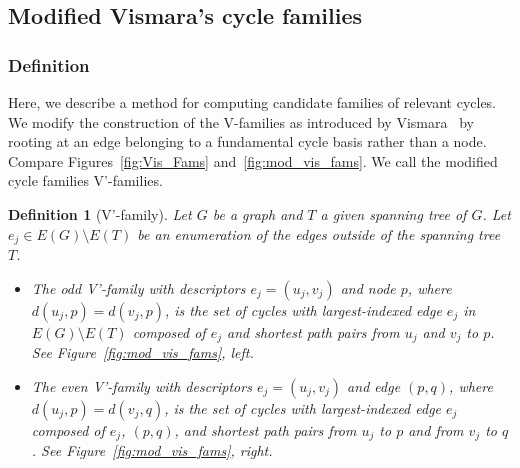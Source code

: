 \documentclass[fleqn,11pt]{article}
\newtheorem{definition}{Definition}
\begin{document}
\subsection{Modified Vismara's cycle families}
\label{sub:Vis_Fam}


\subsubsection{Definition}

{Here, we describe a method for computing candidate families of relevant cycles. 
We modify the construction of the V-families as introduced by Vismara~\cite{vismaraUnion1997} by rooting at an edge belonging to a fundamental cycle basis rather than a node. 
Compare Figures~\ref{fig:Vis_Fams} and~\ref{fig:mod_vis_fams}.
We call the modified cycle families V'-families.}
\begin{definition}[V'-family]
	Let $G$ be a graph and $T$ a given spanning tree of $G$. Let $e_j\in E(G)\setminus E(T)$ be an enumeration of the edges outside of the spanning tree $T$.
	\begin{itemize}
		\item The odd V'-family with descriptors $e_j = (u_j,v_j)$ and node $p$, where $d(u_j,p)=d(v_j,p)$, is the set of cycles with largest-indexed edge $e_j$ in $E(G)\setminus E(T)$ composed of $e_j$ and shortest path pairs from $u_j$ and $v_j$ to $p$. See Figure~\ref{fig:mod_vis_fams}, left.
		\item The even V'-family with descriptors $e_j=(u_j,v_j)$ and edge $(p,q)$, where $d(u_j,p)=d(v_j,q)$, is the set of cycles with largest-indexed edge $e_j$ composed of $e_j$, $(p,q)$, and shortest path pairs from $u_j$ to $p$ and from $v_j$ to $q$. See Figure~\ref{fig:mod_vis_fams}, right.
	\end{itemize}
	\label{def:mod_vis_fams}
\end{definition}
\end{document}
